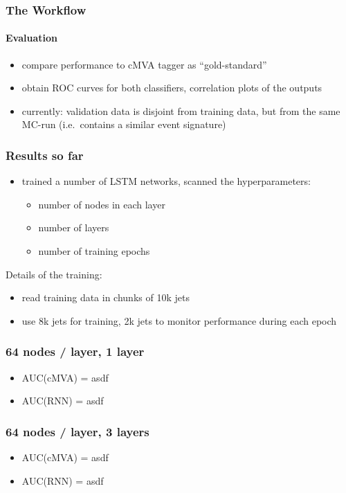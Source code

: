 \documentclass{beamer}
\begin{document}
\begin{frame}
  \frametitle{The Workflow}
  \framesubtitle{Evaluation}
  \begin{itemize}
  \item compare performance to cMVA tagger as ``gold-standard''
  \item obtain ROC curves for both classifiers, correlation plots of the outputs
  \item currently: validation data is disjoint from training data, but from the same MC-run (i.e.~contains a similar event signature)
  \end{itemize}

\end{frame}

\begin{frame}
  \frametitle{Results so far}
  \begin{itemize}
  \item trained a number of LSTM networks, scanned the hyperparameters:
    \begin{itemize}
    \item number of nodes in each layer
    \item number of layers
    \item number of training epochs
    \end{itemize}
  \end{itemize}
  
  Details of the training:
  \begin{itemize}
  \item read training data in chunks of 10k jets
  \item use 8k jets for training, 2k jets to monitor performance during each epoch
  \end{itemize}
\end{frame}

\begin{frame}
  \frametitle{64 nodes / layer, 1 layer}

  \begin{itemize}
  \item AUC(cMVA) = asdf
  \item AUC(RNN) = asdf
  \end{itemize}
\end{frame}

\begin{frame}
  \frametitle{64 nodes / layer, 3 layers}

  \begin{itemize}
  \item AUC(cMVA) = asdf
  \item AUC(RNN) = asdf
  \end{itemize}
\end{frame}
\end{document}

